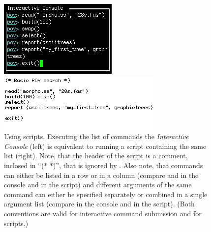 \begin{figure}
\centering
\begin{minipage}[c]{0.42\textwidth}
   		\includegraphics[width=\textwidth]{figures/commandlist.jpg}
\end{minipage}
\quad
\begin{minipage}[c]{0.53\textwidth}
	   	\includegraphics[width=\textwidth]{figures/script.jpg}
   	\end{minipage}
\caption{Using \poy scripts. Executing the list of commands the \emph{Interactive Console} (left)  is equivalent to running a script containing the same list (right). Note, that the header of the script is a comment, inclosed in ``(* *)'', that is ignored by \poy. Also note, that commands can either be listed in a row or in a column (compare  and  in the console and in the script) and different arguments of the same command can either be specified separately or combined in a single argument list (compare  in the console and in the script). (Both conventions are valid for interactive command submission and for scripts.)}
\label{fig:script}
\end{figure}
